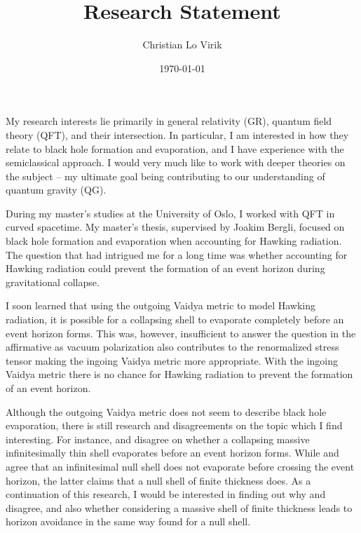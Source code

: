 \documentclass[a4paper,12pt]{article}
\title{Research Statement}
\author{Christian Lo Virik}
\date{\today}
\begin{document}
\maketitle

My research interests lie primarily in general relativity (GR), quantum field theory (QFT), and their intersection. In particular, I am interested in how they relate to black hole formation and evaporation, and I have experience with the semiclassical approach. I would very much like to work with deeper theories on the subject – my ultimate goal being contributing to our understanding of quantum gravity (QG).\newline

During my master’s studies at the University of Oslo, I worked with QFT in curved spacetime. My master’s thesis, supervised by Joakim Bergli, focused on black hole formation and evaporation when accounting for Hawking radiation. The question that had intrigued me for a long time was whether accounting for Hawking radiation could prevent the formation of an event horizon during gravitational collapse.\newline

I soon learned that using the outgoing Vaidya metric to model Hawking radiation, it is possible for a collapsing shell to evaporate completely before an event horizon forms. This was, however, insufficient to answer the question in the affirmative as vacuum polarization also contributes to the renormalized stress tensor making the ingoing Vaidya metric more appropriate. With the ingoing Vaidya metric there is no chance for Hawking radiation to prevent the formation of an event horizon.\newline

Although the outgoing Vaidya metric does not seem to describe black hole evaporation, there is still research and disagreements on the topic which I find interesting. For instance, \textcite{Baccetti_2018} and \textcite{Chen_2018} disagree on whether a collapsing massive infinitesimally thin shell evaporates before an event horizon forms. While \textcite{Chen_2018} and \textcite{Kawai_2013} agree that an infinitesimal null shell does not evaporate before crossing the event horizon, the latter claims that a null shell of finite thickness does. As a continuation of this research, I would be interested in finding out why \textcite{Baccetti_2018} and \textcite{Chen_2018} disagree, and also whether considering a massive shell of finite thickness leads to horizon avoidance in the same way \textcite{Kawai_2013} found for a null shell.\newline
\end{document}
